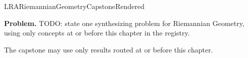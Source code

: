 \ifcsname LRARiemannianGeometryCapstoneRendered\endcsname
\else
\expandafter\gdef\csname LRARiemannianGeometryCapstoneRendered\endcsname{}

\newpage
{}
\label{cap:riemannian-geometry}

\begin{tcolorbox}[
  colback=gray!6,
  colframe=gray!40,
  arc=2pt,
  left=8pt, right=8pt, top=6pt, bottom=6pt,
  title={\small\textbf{Capstone Problem}},
  fonttitle=\small\bfseries
]
\textbf{Problem.}
TODO: state one synthesizing problem for Riemannian Geometry, using only concepts at or
before this chapter in the registry.
\end{tcolorbox}

\begin{remark*}
The capstone may use only results routed at or before this chapter.
\end{remark*}

\clearpage
\fi

